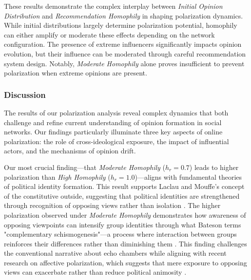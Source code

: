 These results demonstrate the complex interplay between \emph{Initial Opinion Distribution} and \emph{Recommendation Homophily} in shaping polarization dynamics. While initial distributions largely determine polarization potential, homophily can either amplify or moderate these effects depending on the network configuration. The presence of extreme influencers significantly impacts opinion evolution, but their influence can be moderated through careful recommendation system design. Notably, \emph{Moderate Homophily} alone proves insufficient to prevent polarization when extreme opinions are present.

\subsubsection{Discussion}

The results of our polarization analysis reveal complex dynamics that both challenge and refine current understanding of opinion formation in social networks. Our findings particularly illuminate three key aspects of online polarization: the role of cross-ideological exposure, the impact of influential actors, and the mechanisms of opinion drift.

Our most crucial finding—that \emph{Moderate Homophily} ($h_r = 0.7$) leads to higher polarization than \emph{High Homophily} ($h_r = 1.0$)—aligns with fundamental theories of political identity formation. This result supports Laclau and Mouffe's concept of the constitutive outside, suggesting that political identities are strengthened through recognition of opposing views rather than isolation \citep{laclau_hegemony_2014}. The higher polarization observed under \emph{Moderate Homophily} demonstrates how awareness of opposing viewpoints can intensify group identities through what Bateson terms "complementary schismogenesis"—a process where interaction between groups reinforces their differences rather than diminishing them \citep{bateson_naven_1958}. This finding challenges the conventional narrative about echo chambers while aligning with recent research on affective polarization, which suggests that mere exposure to opposing views can exacerbate rather than reduce political animosity \citep{bail_exposure_2018,suhay_polarizing_2018}.

